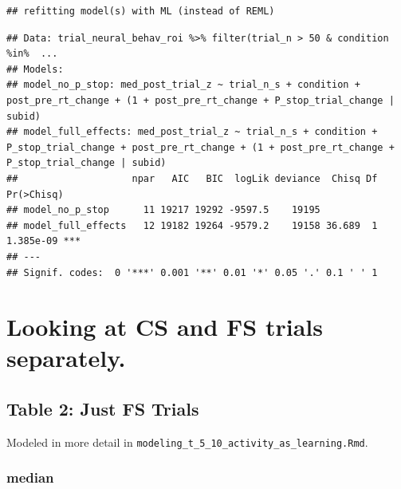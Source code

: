 \documentclass[
]{article}
\newenvironment{Shaded}{\begin{snugshade}}{\end{snugshade}}
\newcommand{\DecValTok}[1]{\textcolor[rgb]{0.00,0.00,0.81}{#1}}
\newcommand{\KeywordTok}[1]{\textcolor[rgb]{0.13,0.29,0.53}{\textbf{#1}}}
\newcommand{\NormalTok}[1]{#1}
\newcommand{\OperatorTok}[1]{\textcolor[rgb]{0.81,0.36,0.00}{\textbf{#1}}}
\newcommand{\StringTok}[1]{\textcolor[rgb]{0.31,0.60,0.02}{#1}}
\begin{document}
\begin{verbatim}
## refitting model(s) with ML (instead of REML)
\end{verbatim}

\begin{verbatim}
## Data: trial_neural_behav_roi %>% filter(trial_n > 50 & condition %in%  ...
## Models:
## model_no_p_stop: med_post_trial_z ~ trial_n_s + condition + post_pre_rt_change + (1 + post_pre_rt_change + P_stop_trial_change | subid)
## model_full_effects: med_post_trial_z ~ trial_n_s + condition + P_stop_trial_change + post_pre_rt_change + (1 + post_pre_rt_change + P_stop_trial_change | subid)
##                    npar   AIC   BIC  logLik deviance  Chisq Df Pr(>Chisq)    
## model_no_p_stop      11 19217 19292 -9597.5    19195                         
## model_full_effects   12 19182 19264 -9579.2    19158 36.689  1  1.385e-09 ***
## ---
## Signif. codes:  0 '***' 0.001 '**' 0.01 '*' 0.05 '.' 0.1 ' ' 1
\end{verbatim}

\hypertarget{looking-at-cs-and-fs-trials-separately.}{%
\section{Looking at CS and FS trials
separately.}\label{looking-at-cs-and-fs-trials-separately.}}

\hypertarget{table-2-just-fs-trials}{%
\subsection{Table 2: Just FS Trials}\label{table-2-just-fs-trials}}

Modeled in more detail in
\texttt{modeling\_t\_5\_10\_activity\_as\_learning.Rmd}.

\hypertarget{median}{%
\subsubsection{median}\label{median}}

\begin{Shaded}
\end{Shaded}
\end{document}

